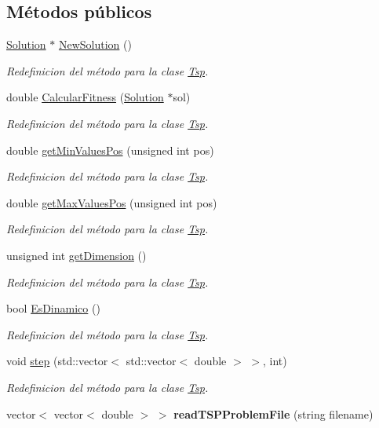 \subsection*{Métodos públicos}
\begin{DoxyCompactItemize}
\item 
\hyperlink{class_solution}{Solution} $\ast$ \hyperlink{class_tsp_ab37f446ab806d6f42e036a815a8eb0fb}{New\+Solution} ()
\begin{DoxyCompactList}\small\item\em Redefinicion del método para la clase \hyperlink{class_tsp}{Tsp}. \end{DoxyCompactList}\item 
double \hyperlink{class_tsp_a84ed21c114ae235e2c0f56177c164a0a}{Calcular\+Fitness} (\hyperlink{class_solution}{Solution} $\ast$sol)
\begin{DoxyCompactList}\small\item\em Redefinicion del método para la clase \hyperlink{class_tsp}{Tsp}. \end{DoxyCompactList}\item 
double \hyperlink{class_tsp_aae80b10d5d2b846a5f7d03fc44263ab2}{get\+Min\+Values\+Pos} (unsigned int pos)
\begin{DoxyCompactList}\small\item\em Redefinicion del método para la clase \hyperlink{class_tsp}{Tsp}. \end{DoxyCompactList}\item 
double \hyperlink{class_tsp_a5bdc7d7f407f9bc2084d77c971cb99ef}{get\+Max\+Values\+Pos} (unsigned int pos)
\begin{DoxyCompactList}\small\item\em Redefinicion del método para la clase \hyperlink{class_tsp}{Tsp}. \end{DoxyCompactList}\item 
unsigned int \hyperlink{class_tsp_a0f6463fc9e034a8c78bf4cac881df990}{get\+Dimension} ()
\begin{DoxyCompactList}\small\item\em Redefinicion del método para la clase \hyperlink{class_tsp}{Tsp}. \end{DoxyCompactList}\item 
bool \hyperlink{class_tsp_a9a77be6018464e5380296fa8decc36ac}{Es\+Dinamico} ()
\begin{DoxyCompactList}\small\item\em Redefinicion del método para la clase \hyperlink{class_tsp}{Tsp}. \end{DoxyCompactList}\item 
void \hyperlink{class_tsp_a15c1d7f52f3d6ce233d86beda80eabf4}{step} (std\+::vector$<$ std\+::vector$<$ double $>$ $>$, int)
\begin{DoxyCompactList}\small\item\em Redefinicion del método para la clase \hyperlink{class_tsp}{Tsp}. \end{DoxyCompactList}\item 
\hypertarget{class_tsp_a499348dd3e9939f2cf04603382735285}{vector$<$ vector$<$ double $>$ $>$ {\bfseries read\+T\+S\+P\+Problem\+File} (string filename)}\label{class_tsp_a499348dd3e9939f2cf04603382735285}


\end{DoxyCompactItemize}
